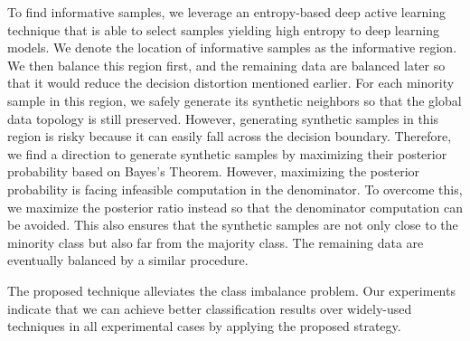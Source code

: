 To find informative samples, we leverage an entropy-based deep active learning technique that is able to select samples yielding high entropy to deep learning models. We denote the location of informative samples as the informative region. We then balance this region first, and the remaining data are balanced later so that it would reduce the decision distortion mentioned earlier. For each minority sample in this region, we safely generate its synthetic neighbors so that the global data topology is still preserved. However, generating synthetic samples in this region is risky because it can easily fall across the decision boundary. Therefore, we find a direction to generate synthetic samples by maximizing their posterior probability based on Bayes's Theorem. However, maximizing the posterior probability is facing infeasible computation in the denominator. To overcome this, we maximize the posterior ratio instead so that the denominator computation can be avoided. This also ensures that the synthetic samples are not only close to the minority class but also far from the majority class. The remaining data are eventually balanced by a similar procedure. 

The proposed technique alleviates the class imbalance problem. Our experiments indicate that we can achieve better classification results over widely-used techniques in all experimental cases by applying the proposed strategy.  

